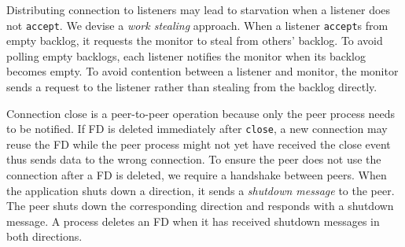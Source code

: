 Distributing connection to listeners may lead to starvation when a listener does not \texttt{accept}. We devise a \textit{work stealing} approach. When a listener \texttt{accept}s from empty backlog, it requests the monitor to steal from others' backlog. To avoid polling empty backlogs, each listener notifies the monitor when its backlog becomes empty. To avoid contention between a listener and monitor, the monitor sends a request to the listener rather than stealing from the backlog directly.


Connection close is a peer-to-peer operation because only the peer process needs to be notified. If FD is deleted immediately after \texttt{close}, a new connection may reuse the FD while the peer process might not yet have received the close event thus sends data to the wrong connection. To ensure the peer does not use the connection after a FD is deleted, we require a handshake between peers.
When the application shuts down a direction, it sends a \textit{shutdown message} to the peer. The peer shuts down the corresponding direction and responds with a shutdown message. A process deletes an FD when it has received shutdown messages in both directions.






